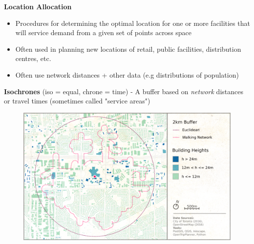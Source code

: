 \documentclass[aspectratio=169]{beamer}
\begin{document}
\begin{frame}

	
	\textbf{Location Allocation}
	\begin{itemize}
		\item Procedures for determining the optimal location for one or more facilities that will service demand from a given set of points across space
		\item Often used in planning new locations of retail, public facilities, distribution centres, etc.
		\item Often use network distances + other data (e.g distributions of population)
	\end{itemize}
	
\end{frame}







\begin{frame}
	
	\textbf{Isochrones} (iso = equal, chrone = time) - A buffer based on \textit{network} distances or travel times (sometimes called "service areas")
	
	
	\begin{figure}
		\centering
		\includegraphics[width=0.8\linewidth]{images/STC_buffers}
	\end{figure}
	
	
\end{frame}
\end{document}
